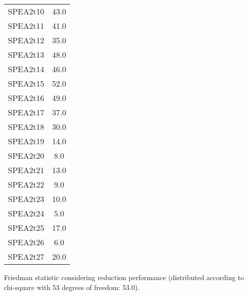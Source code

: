 \documentclass{article}
\begin{document}
\begin{table}[!htp]
\begin{tabular}{c|c}
SPEA2t10&43.0\\
SPEA2t11&41.0\\
SPEA2t12&35.0\\
SPEA2t13&48.0\\
SPEA2t14&46.0\\
SPEA2t15&52.0\\
SPEA2t16&49.0\\
SPEA2t17&37.0\\
SPEA2t18&30.0\\
SPEA2t19&14.0\\
SPEA2t20&8.0\\
SPEA2t21&13.0\\
SPEA2t22&9.0\\
SPEA2t23&10.0\\
SPEA2t24&5.0\\
SPEA2t25&17.0\\
SPEA2t26&6.0\\
SPEA2t27&20.0\\
\end{tabular}
\end{table}


Friedman statistic considering reduction performance (distributed according to chi-square with 53 degrees of freedom: 53.0).
\end{document}
